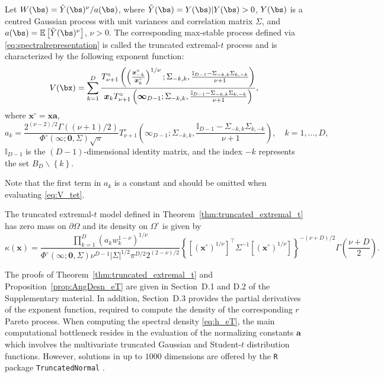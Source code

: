 \documentclass[12pt]{article}
\begin{document}
\begin{theorem}
\label{thm:truncated_extremal_t}   
Let $W(\bs) = \tilde{Y}(\bs)^\nu / a(\bs)$, where $\tilde{Y}(\bs) = Y(\bs)|Y(\bs)>0$, $Y(\bs)$ is a centred Gaussian process with unit variances and correlation matrix $\Sigma$, and $a(\bs) = \mathbb{E}\left[ \tilde{Y}(\bs)^\nu\right]$, $\nu>0$.
The corresponding max-stable process defined via \eqref{eq:spectralrepresentation} is called the truncated extremal-$t$ process and is characterized by the following exponent function:
%
\begin{equation}
\label{eq:V_tet}
V(\bx) = \sum_{k=1}^D \frac{T_{\nu+1}^\circ\left( \left(\frac{\bm x_{-k}^\circ}{\bm x_{k}^\circ}\right)^{1/\nu} ;\Sigma_{-k,k},\frac{\mathbb{I}_{D-1}-\Sigma_{-k,k}\Sigma_{k,-k} }{\nu+1}\right)}{\bm x_k T_{\nu+1}^\circ\left(\bm \infty_{D-1};\Sigma_{-k,k}, \frac{\mathbb{I}_{D-1}-\Sigma_{-k,k} \Sigma_{k,-k}}{\nu+1}\right)},
\end{equation}
%
where $\bm x^\circ = \bm x \bm a$,
%
\begin{equation*}
a_k = \frac{2^{(\nu-2)/2}\Gamma((\nu+1)/2)}{\Phi^\circ(\bm \infty;\bm 0, \Sigma) \sqrt{\pi}} T_{\nu+1}^\circ\left(
\bm \infty_{D-1};
\Sigma_{-k,k}, \frac{\mathbb{I}_{D-1} -\Sigma_{-k,k} \Sigma_{k,-k}}{\nu+1} \right), \quad k=1,\dots,D,	    
\end{equation*}
%
$\mathbb{I}_{D-1}$ is the $(D-1)$-dimensional identity matrix, and the index $-k$ represents the set $B_D \backslash \left\{ k\right\}$.
%
\end{theorem}
%
Note that the first term in $a_k$ is a constant and should be omitted when evaluating \eqref{eq:V_tet}.
%
\begin{proposition}
\label{prop:AngDesn_eT}
The truncated extremal-$t$ model defined in Theorem~\ref{thm:truncated_extremal_t} has zero mass on $\partial\Omega$ and its density on $\Omega^\circ$ is given by
%
\begin{equation}
\label{eq:h_eT}
\kappa(\bm x) = \frac{\prod_{k=1}^D \left(a_k w_k^{1-\nu}\right)^{1/\nu}}{\Phi^\circ(\bm \infty;\bm 0, \Sigma) \nu^{D-1}|\Sigma|^{1/2}\pi^{D/2}2^{(2-\nu)/2}} \left\{\left[(\bm x^\circ)^{1/\nu}\right]^\top \Sigma^{-1}\left[(\bm x^\circ)^{1/\nu}\right]\right\}^{-(\nu+D)/2} \Gamma\left(\frac{\nu+D}{2}\right).
\end{equation}%
\end{proposition}

The proofs of Theorem~\ref{thm:truncated_extremal_t}  and Proposition~\ref{prop:AngDesn_eT} are given in Section~D.1 and D.2 of the Supplementary material. In addition, Section~D.3 provides the partial derivatives of the exponent function, required to compute the density of the corresponding $r$ Pareto process.
When computing the spectral density \eqref{eq:h_eT}, the main computational bottleneck resides in the evaluation of the normalizing constants $\bm a$ which involves the multivariate truncated Gaussian and Student-$t$ distribution functions. 
However, solutions in up to $1000$ dimensions are offered by the \texttt{R} package \texttt{TruncatedNormal} \citep{Botev.Belzile:2021}.   
\end{document}

